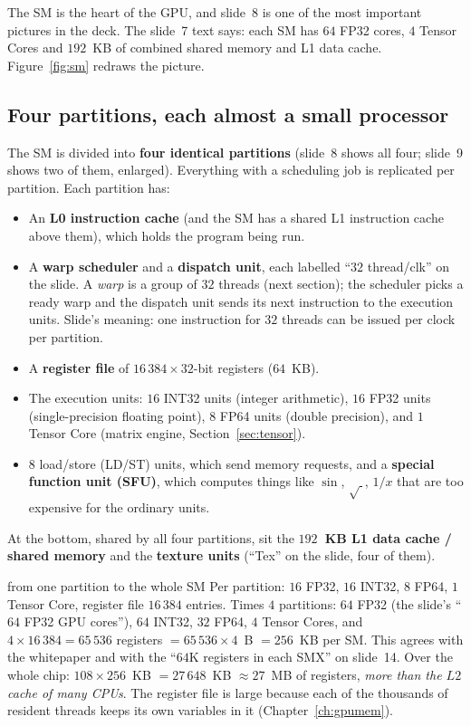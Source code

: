 
The SM is the heart of the GPU, and slide~8 is one of the most important pictures in the deck. The
slide~7 text says: each SM has $64$ FP32 cores, $4$ Tensor Cores and $192$~KB of combined shared memory and L1 data cache. Figure~\ref{fig:sm} redraws the picture.



\subsection{Four partitions, each almost a small processor}

The SM is divided into \textbf{four identical partitions} (slide~8 shows all four; slide~9 shows two of them, enlarged). Everything with a scheduling job is replicated per partition. Each partition has:
\begin{itemize}
  \item An \textbf{L0 instruction cache} (and the SM has a shared L1 instruction cache above them), which holds the program being run.
  \item A \textbf{warp scheduler} and a \textbf{dispatch unit}, each labelled ``$32$ thread/clk'' on the slide. A \emph{warp} is a group of $32$ threads (next section); the scheduler picks a ready warp and the dispatch unit sends its next instruction to the execution units. Slide's meaning: one instruction for $32$ threads can be issued per clock per partition.
  \item A \textbf{register file} of $16\,384\times32$-bit registers ($64$~KB).
  \item The execution units: $16$ INT32 units (integer arithmetic), $16$ FP32 units (single-precision floating point), $8$ FP64 units (double precision), and $1$ Tensor Core (matrix engine, Section~\ref{sec:tensor}).
  \item $8$ load/store (LD/ST) units, which send memory requests, and a \textbf{special function unit (SFU)}, which computes things like $\sin$, $\sqrt{\ }$, $1/x$ that are too expensive for the ordinary units.
\end{itemize}
At the bottom, shared by all four partitions, sit the \textbf{$192$~KB L1 data cache / shared memory} and the \textbf{texture units} (``Tex'' on the slide, four of them).

\begin{workedex}{from one partition to the whole SM}
Per partition: $16$ FP32, $16$ INT32, $8$ FP64, $1$ Tensor Core, register file $16\,384$ entries.
Times $4$ partitions: $64$ FP32 (the slide's ``$64$ FP32 GPU cores''), $64$ INT32, $32$ FP64, $4$ Tensor Cores,
and $4\times16\,384=65\,536$ registers $=65\,536\times4$~B $=256$~KB per SM. This agrees with the whitepaper and with
the ``$64$K registers in each SMX'' on slide~14.
Over the whole chip: $108\times256$~KB $=27\,648$~KB $\approx27$~MB of registers, \emph{more than the $L2$ cache of many CPUs}.
The register file is large because each of the thousands of resident threads keeps its own variables
in it (Chapter~\ref{ch:gpumem}).
\end{workedex}

